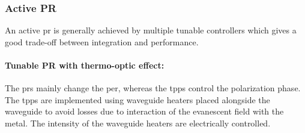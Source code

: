 \documentclass[../report.tex]{subfiles}
\begin{document}
		\subsubsection{Active PR}\label{sec:active_pr}
An active \gls{pr} is generally achieved by multiple tunable controllers which gives a good trade-off between integration and performance. 
	\paragraph*{Tunable PR with thermo-optic effect:} The \gls{pr}s mainly change the \gls{per}, whereas the \gls{tpps} control the polarization phase. The \gls{tpps} are implemented using waveguide heaters placed alongside the waveguide to avoid losses due to interaction of the evanescent field with the metal. The intensity of the waveguide heaters are electrically controlled.	
	
\end{document}
